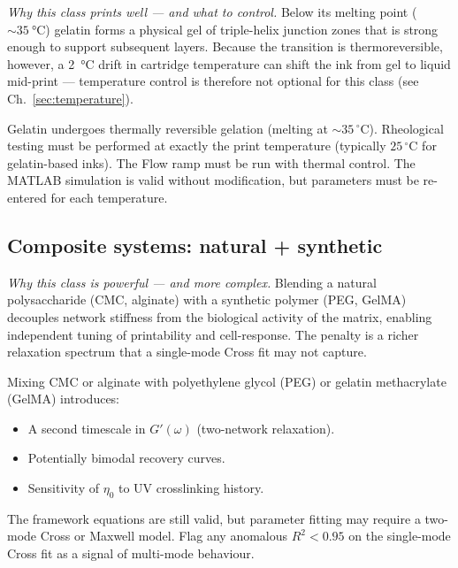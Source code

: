 \documentclass[11pt,a4paper]{article}
\begin{document}
\emph{Why this class prints well — and what to control.}
Below its melting point ($\sim \SI{35}{\celsius}$) gelatin forms a
physical gel of triple-helix junction zones that is strong enough to
support subsequent layers.  Because the transition is thermoreversible,
however, a \SI{2}{\celsius} drift in cartridge temperature can shift
the ink from gel to liquid mid-print — temperature control is therefore
not optional for this class (see Ch.~\ref{sec:temperature}).

Gelatin undergoes thermally reversible gelation (melting at $\sim 35\,^\circ$C).
Rheological testing must be performed at exactly the print temperature
(typically $25\,^\circ$C for gelatin-based inks). The Flow ramp must
be run with thermal control. The MATLAB simulation is valid without
modification, but parameters must be re-entered for each temperature.

\subsection{Composite systems: natural + synthetic}

\emph{Why this class is powerful — and more complex.}
Blending a natural polysaccharide (CMC, alginate) with a synthetic
polymer (PEG, GelMA) decouples network stiffness from the biological
activity of the matrix, enabling independent tuning of printability
and cell-response.  The penalty is a richer relaxation spectrum that
a single-mode Cross fit may not capture.

Mixing CMC or alginate with polyethylene glycol (PEG) or gelatin
methacrylate (GelMA) introduces:
\begin{itemize}[leftmargin=1.6em,itemsep=2pt]
\item A second timescale in $G'(\omega)$ (two-network relaxation).
\item Potentially bimodal recovery curves.
\item Sensitivity of $\eta_0$ to UV crosslinking history.
\end{itemize}
The framework equations are still valid, but parameter fitting may require
a two-mode Cross or Maxwell model. Flag any anomalous $R^2<0.95$ on the
single-mode Cross fit as a signal of multi-mode behaviour.
\end{document}
